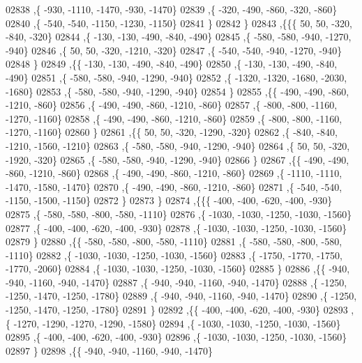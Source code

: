 \begin{DoxyCode}
02838     ,\{  -930, -1110, -1470,  -930, -1470\}
02839     ,\{  -320,  -490,  -860,  -320,  -860\}
02840     ,\{  -540,  -540, -1150, -1230, -1150\}
02841     \}
02842    \}
02843   ,\{\{\{    50,    50,  -320,  -840,  -320\}
02844     ,\{  -130,  -130,  -490,  -840,  -490\}
02845     ,\{  -580,  -580,  -940, -1270,  -940\}
02846     ,\{    50,    50,  -320, -1210,  -320\}
02847     ,\{  -540,  -540,  -940, -1270,  -940\}
02848     \}
02849    ,\{\{  -130,  -130,  -490,  -840,  -490\}
02850     ,\{  -130,  -130,  -490,  -840,  -490\}
02851     ,\{  -580,  -580,  -940, -1290,  -940\}
02852     ,\{ -1320, -1320, -1680, -2030, -1680\}
02853     ,\{  -580,  -580,  -940, -1290,  -940\}
02854     \}
02855    ,\{\{  -490,  -490,  -860, -1210,  -860\}
02856     ,\{  -490,  -490,  -860, -1210,  -860\}
02857     ,\{  -800,  -800, -1160, -1270, -1160\}
02858     ,\{  -490,  -490,  -860, -1210,  -860\}
02859     ,\{  -800,  -800, -1160, -1270, -1160\}
02860     \}
02861    ,\{\{    50,    50,  -320, -1290,  -320\}
02862     ,\{  -840,  -840, -1210, -1560, -1210\}
02863     ,\{  -580,  -580,  -940, -1290,  -940\}
02864     ,\{    50,    50,  -320, -1920,  -320\}
02865     ,\{  -580,  -580,  -940, -1290,  -940\}
02866     \}
02867    ,\{\{  -490,  -490,  -860, -1210,  -860\}
02868     ,\{  -490,  -490,  -860, -1210,  -860\}
02869     ,\{ -1110, -1110, -1470, -1580, -1470\}
02870     ,\{  -490,  -490,  -860, -1210,  -860\}
02871     ,\{  -540,  -540, -1150, -1500, -1150\}
02872     \}
02873    \}
02874   ,\{\{\{  -400,  -400,  -620,  -400,  -930\}
02875     ,\{  -580,  -580,  -800,  -580, -1110\}
02876     ,\{ -1030, -1030, -1250, -1030, -1560\}
02877     ,\{  -400,  -400,  -620,  -400,  -930\}
02878     ,\{ -1030, -1030, -1250, -1030, -1560\}
02879     \}
02880    ,\{\{  -580,  -580,  -800,  -580, -1110\}
02881     ,\{  -580,  -580,  -800,  -580, -1110\}
02882     ,\{ -1030, -1030, -1250, -1030, -1560\}
02883     ,\{ -1750, -1770, -1750, -1770, -2060\}
02884     ,\{ -1030, -1030, -1250, -1030, -1560\}
02885     \}
02886    ,\{\{  -940,  -940, -1160,  -940, -1470\}
02887     ,\{  -940,  -940, -1160,  -940, -1470\}
02888     ,\{ -1250, -1250, -1470, -1250, -1780\}
02889     ,\{  -940,  -940, -1160,  -940, -1470\}
02890     ,\{ -1250, -1250, -1470, -1250, -1780\}
02891     \}
02892    ,\{\{  -400,  -400,  -620,  -400,  -930\}
02893     ,\{ -1270, -1290, -1270, -1290, -1580\}
02894     ,\{ -1030, -1030, -1250, -1030, -1560\}
02895     ,\{  -400,  -400,  -620,  -400,  -930\}
02896     ,\{ -1030, -1030, -1250, -1030, -1560\}
02897     \}
02898    ,\{\{  -940,  -940, -1160,  -940, -1470\}

\end{DoxyCode}
